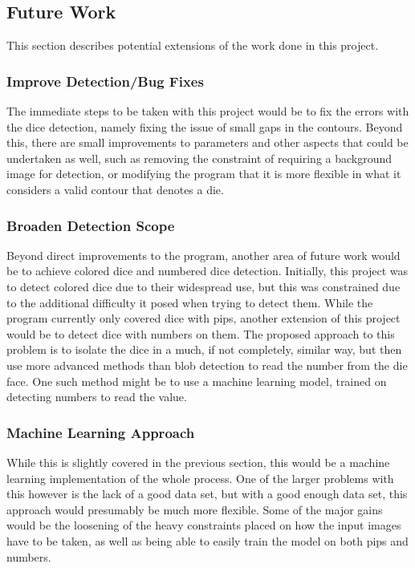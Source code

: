 \documentclass[journal]{IEEEtran}
\begin{document}
\subsection{Future Work}
This section describes potential extensions of the work done in this project.\\

\subsubsection{Improve Detection/Bug Fixes}
The immediate steps to be taken with this project would be to fix the errors with the dice detection, namely fixing the issue of small gaps in the contours. Beyond this, there are small improvements to parameters and other aspects that could be undertaken as well, such as removing the constraint of requiring a background image for detection, or modifying the program that it is more flexible in what it considers a valid contour that denotes a die.\\

\subsubsection{Broaden Detection Scope}
Beyond direct improvements to the program, another area of future work would be to achieve colored dice and numbered dice detection. Initially, this project was to detect colored dice due to their widespread use, but this was constrained due to the additional difficulty it posed when trying to detect them. While the program currently only covered dice with pips, another extension of this project would be to detect dice with numbers on them. The proposed approach to this problem is to isolate the dice in a much, if not completely, similar way, but then use more advanced methods than blob detection to read the number from the die face. One such method might be to use a machine learning model, trained on detecting numbers to read the value.\\

\subsubsection{Machine Learning Approach}
While this is slightly covered in the previous section, this would be a machine learning implementation of the whole process. One of the larger problems with this however is the lack of a good data set, but with a good enough data set, this approach would presumably be much more flexible. Some of the major gains would be the loosening of the heavy constraints placed on how the input images have to be taken, as well as being able to easily train the model on both pips and numbers.\\
\end{document}
